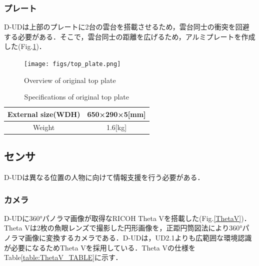 \documentclass[12pt]{sonota/aislab}
\begin{document}
\subsubsection{プレート}
D-UDは上部のプレートに2台の雲台を搭載させるため，雲台同士の衝突を回避する必要がある．そこで，雲台同士の距離を広げるため，アルミプレートを作成した(Fig.\ref{plate})．

\begin{figure}[t]
\begin{center}
\texttt{[image: figs/top\_plate.png]}
\caption{Overview of original top plate}
\label{plate}
\end{center}
\end{figure}

\begin{table}[t]
	\caption{Specifications of original top plate}
	\label{table:plate}
	\centering 
	\begin{tabular}[tbp]{|c|c|}
		\hline 
		External size(WDH) & 650×290×5[mm] \\\hline
		Weight & 1.6[kg] \\\hline
	\end{tabular}
\end{table}

\subsection{センサ}
D-UDは異なる位置の人物に向けて情報支援を行う必要がある．

\subsubsection{カメラ}
D-UDに360°パノラマ画像が取得なRICOH Theta Vを搭載した(Fig.\ref{ThetaV})．Theta Vは2枚の魚眼レンズで撮影した円形画像を，正距円筒図法により360°パノラマ画像に変換するカメラである．D-UDは，UD2.1よりも広範囲な環境認識が必要になるためTheta Vを採用している．Theta Vの仕様をTable\ref{table:ThetaV_TABLE}に示す．
\end{document}
